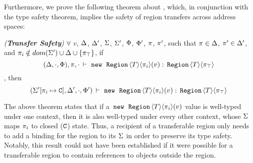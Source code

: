 Furthermore, we prove the following theorem about \FB, which, in
conjunction with the type safety theorem, implies the safety of region
transfers across address spaces:
\begin{theorem}
\emph{(\textbf{Transfer Safety})}
\label{thm:fb-transfer-safety-stmt}
$\forall$ $v$, $\Delta$, $\Delta'$, $\Sigma$, $\Sigma'$, $\Phi$,
$\Phi'$, $\pi$, $\pi'$, such that $\pi \in \Delta$, $\pi' \in \Delta'$, and
$\pi_i \notin dom(\Sigma') \cup \Delta \cup \{\pi_{\top}\}$, if
\[
  (\Delta,\cdot,\Phi),\pi, \cdot\,\vdash\,\,{\tt new}\,\; \,{\tt Region}\,\langle T \rangle\langle \pi_i \rangle(v):\,{\tt Region}\,\langle T \rangle\langle \pi_{\top} \rangle
\]
, then
\[
  (\Sigma'[\pi_i \mapsto \mathtt{C}],\Delta',\cdot,\Phi')\,\vdash\,\,{\tt new}\,\; \,{\tt Region}\,\langle T \rangle\langle \pi_i \rangle(v):\,{\tt Region}\,\langle T \rangle\langle \pi_{\top} \rangle
\]
\end{theorem}
The above theorem states that if a $\,{\tt new}\,\; \,{\tt Region}\,\langle T \rangle\langle \pi_i \rangle(v)$ value
is well-typed under one context, then it is also well-typed under
every other context, whose $\Sigma$ maps $\pi_i$ to closed
($\mathtt{C}$) state.  Thus, a recipient of a transferable region only
needs to add a binding for the region to its $\Sigma$ in order to
preserve its type safety. Notably, this result could not have been
established if it were possible for a transferable region to contain
references to objects outside the region.
